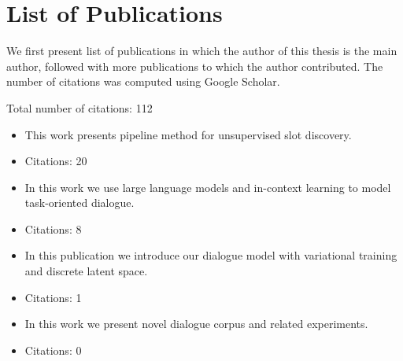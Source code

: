 \chapter*{List of Publications}

\noindent We first present list of publications in which the author of this thesis is the main author, followed with more publications to which the author contributed. The number of citations was computed using Google Scholar.

Total number of citations: 112 


\vfill

\noindent{}
\begin{itemize}[noitemsep,topsep=0pt]

\item This work presents pipeline method for unsupervised slot discovery.
\item Citations: 20

\end{itemize}\vspace{.5\baselineskip}

\noindent{}
\begin{itemize}[noitemsep,topsep=0pt]

\item In this work we use large language models and in-context learning to model task-oriented dialogue.

\item Citations: 8
\end{itemize}\vspace{.5\baselineskip}


\noindent{}
\begin{itemize}[noitemsep,topsep=0pt]

\item In this publication we introduce our dialogue model with variational training and discrete latent space.
\item Citations: 1

\end{itemize}\vspace{.5\baselineskip}

\noindent{}
\begin{itemize}[noitemsep,topsep=0pt]

\item In this work we present novel dialogue corpus and related experiments.
\item Citations: 0

\end{itemize}\vspace{.5\baselineskip}


